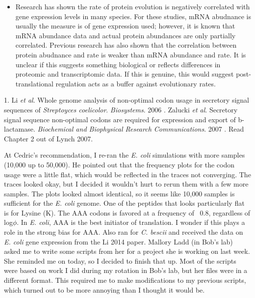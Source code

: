\documentclass[11pt]{labbook}
\begin{document}
\begin{itemize}
\item Research has shown the rate of protein evolution is negatively correlated with gene expression levels in many species. For these studies, mRNA abudnance is usually the measure is of gene expression used; however, it is known that mRNA abundance data and actual protein abundances are only partially correlated. Previous research has also shown that the correlation between protein abudnance and rate is weaker than mRNA abundance and rate. It is unclear if this suggests something biological or reflects differences in proteomic and transcriptomic data. If this is genuine, this would suggest post-translational regulation acts as a buffer against evolutionary rates.
\end{itemize}

1. Li \textit{et al}.
Whole genome analysis of non-optimal codon usage in secretory signal sequences of \textit{Streptoyces coelicolor}. \textit{Biosystems}. 2006
. Zalucki \textit{et al}. Secretory signal sequence non-optimal codons are required for expression and export of b-lactamase. \textit{Biochemical and Biophysical Research Communications}. 2007
. Read Chapter 2 out of Lynch 2007.
\let\cleardoublepage\clearpage

At Cedric's recommendation, I re-ran the \textit{E. coli} simulations with more samples (10,000 up to 50,000). He pointed out that the frequency plots for the codon usage were a little flat, which would be reflected in the traces not converging. The traces looked okay, but I decided it wouldn't hurt to rerun them with a few more samples. The plots looked almost identical, so it seems like 10,000 samples is sufficient for the \textit{E. coli} genome. One of the peptides that looks particularly flat is for Lysine (K). The AAA codons is favored at a frequency of ~0.8, regardless of log$\phi$. In \textit{E. coli}, AAA is the best initiator of translation. I wonder if this plays a role in the strong bias for AAA.
\newline
Also ran for \textit{C. bescii} and received the data on \textit{E. coli} gene expression from the Li 2014 paper.
\newline
Mallory Ladd (in Bob's lab) asked me to write some scripts from her for a project she is working on last week. She reminded me on today, so I decided to finish that up. Most of the scripts were based on work I did during my rotation in Bob's lab, but her files were in a different format. This required me to make modifications to my previous scripts, which turned out to be more annoying than I thought it would be.
\end{document}
